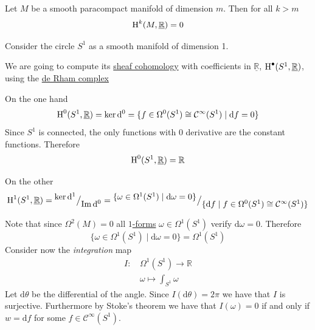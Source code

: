 \documentclass[../../main]{subfiles}
\begin{document}
\begin{corollary}
  Let \(M\) be a smooth paracompact manifold of dimension \(m\).
  Then for all \(k > m\)
  \begin{equation*}
    \operatorname{H}^{k}(M, \underline{\mathbb{R}}) = 0
  \end{equation*}
\end{corollary}

\begin{example}
  Consider the circle \(S^{1}\) as a smooth manifold of dimension 1.

  We are going to compute its \hyperref[def:sheaf-cohomology]{sheaf cohomology} with coefficients in \(\underline{\mathbb{R}}\), \(\operatorname{H}^{\bullet}(S^{1}, \underline{\mathbb{R}})\), using the \hyperref[def:de-rham-complex]{de Rham complex}
  \begin{center}
  \end{center}

  On the one hand
  \begin{equation*}
    \operatorname{H}^{0}(S^{1}, \underline{\mathbb{R}}) = \ker \mathrm{d}^{0} = \{f \in \Omega^{0}(S^{1}) \cong \mathcal{C}^{\infty}(S^{1}) \mid \mathrm{d} f = 0\}
  \end{equation*}
  Since \(S^{1}\) is connected, the only functions with 0 derivative are the constant functions.
  Therefore
  \begin{equation*}
    \operatorname{H}^{0}(S^{1}, \underline{\mathbb{R}}) = \mathbb{R}
  \end{equation*}

  On the other
  \begin{equation*}
    \operatorname{H}^{1}(S^{1}, \underline{\mathbb{R}}) = {^{\textstyle \ker \mathrm{d}^{1}}\big/_{\textstyle \operatorname*{Im} \mathrm{d}^{0}}} = {^{\textstyle \{\omega \in \Omega^{1}(S^{1}) \mid \mathrm{d} \omega = 0\}}\big/_{\textstyle \{\mathrm{d} f \mid f \in \Omega^{0}(S^{1}) \cong \mathcal{C}^{\infty}(S^{1})\}}}
  \end{equation*}

  Note that since \(\Omega^{2}(M) = 0\) all \hyperref[def:smooth-k-form]{\(1\)-forms} \(\omega \in \Omega^{1}(S^{1})\) verify \(\mathrm{d}\omega = 0\).
  Therefore
  \begin{equation*}
    \{\omega \in \Omega^{1}(S^{1}) \mid \mathrm{d}\omega = 0\} = \Omega^{1}(S^{1})
  \end{equation*}
  Consider now the \textit{integration} map
  \begin{align*}
    I:\,& \Omega^{1}(S^{1}) \to \mathbb{R} \\
        & \omega \mapsto \int_{S^{1}} \omega 
  \end{align*}
  Let \(\mathrm{d}\theta\) be the differential of the angle.
  Since \(I(\mathrm{d}\theta) = 2\pi\) we have that \(I\) is surjective.
  Furthermore by Stoke's theorem we have that \(I(\omega) = 0\) if and only if \(w = \mathrm{d}f\) for some \(f \in \mathcal{C}^{\infty}(S^{1})\).


\end{example}
\end{document}
